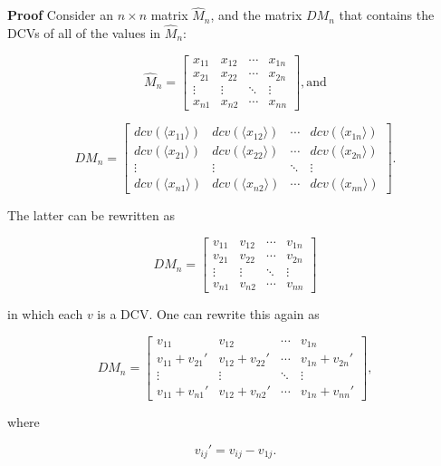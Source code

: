 \documentclass[10pt,letterpaper]{article}
\newenvironment{proof}{\noindent\textbf{Proof} }{\qed \newline}
\newcommand{\qed}{\nobreak \ifvmode \relax \else
      \ifdim\lastskip<1.5em \hskip-\lastskip
      \hskip1.5em plus0em minus0.5em \fi \nobreak
      \vrule height0.75em width0.5em depth0.25em\fi}
\numberwithin{equation}{section}
\begin{document}
\begin{proof}Consider an $n \times n$ matrix $\hat M_n$, and the matrix
  $DM_n$ that contains the DCVs of all of the values in $\hat M_n$:

\[ \hat M_n = \left[ \begin{matrix} 
  x_{11} & x_{12} & \cdots & x_{1n} \\
  x_{21} & x_{22} & \cdots & x_{2n} \\
  \vdots & \vdots & \ddots & \vdots \\
  x_{n1} & x_{n2} & \cdots & x_{nn}
 \end{matrix} \right] , \mbox{and} \]

\[ DM_n = \left[ \begin{matrix} 
  dcv(\langle x_{11} \rangle) & dcv(\langle x_{12} \rangle) & \cdots & dcv(\langle x_{1n} \rangle) \\
  dcv(\langle x_{21} \rangle) & dcv(\langle x_{22} \rangle) & \cdots & dcv(\langle x_{2n} \rangle) \\
  \vdots & \vdots & \ddots & \vdots \\
  dcv(\langle x_{n1} \rangle) & dcv(\langle x_{n2} \rangle) & \cdots & dcv(\langle x_{nn} \rangle)
 \end{matrix} \right] . \]

The latter can be rewritten as

\[ DM_n = \left[ \begin{matrix} 
  v_{11} & v_{12} & \cdots & v_{1n} \\
  v_{21} & v_{22} & \cdots & v_{2n} \\
  \vdots & \vdots & \ddots & \vdots \\
  v_{n1} & v_{n2} & \cdots & v_{nn}
 \end{matrix} \right] \]

in which each $v$ is a DCV.  One can rewrite this again as

\[ DM_n = \left[ \begin{matrix} 
  v_{11} & v_{12} & \cdots & v_{1n} \\
  v_{11} + v_{21} \prime & v_{12} + v_{22} \prime & \cdots & v_{1n} + v_{2n} \prime \\
  \vdots & \vdots & \ddots & \vdots \\
  v_{11} + v_{n1} \prime & v_{12} + v_{n2} \prime & \cdots & v_{1n} + v_{nn} \prime
 \end{matrix} \right] , \]

where

\[ v_{ij} \prime = v_{ij} - v_{1j} . \]


\end{proof}
\end{document}

